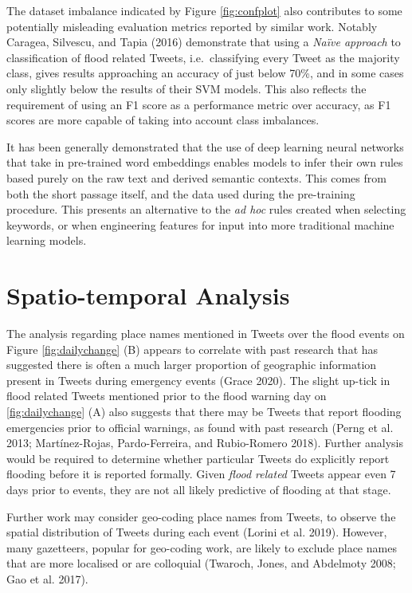 \documentclass[a4paper, notitlepage]{extreport}
\begin{document}
The dataset imbalance indicated by Figure \ref{fig:confplot} also
contributes to some potentially misleading evaluation metrics reported
by similar work. Notably Caragea, Silvescu, and Tapia (2016) demonstrate
that using a \emph{Naïve approach} to classification of flood related
Tweets, i.e.~classifying every Tweet as the majority class, gives
results approaching an accuracy of just below 70\%, and in some cases
only slightly below the results of their SVM models. This also reflects
the requirement of using an F1 score as a performance metric over
accuracy, as F1 scores are more capable of taking into account class
imbalances.

It has been generally demonstrated that the use of deep learning neural
networks that take in pre-trained word embeddings enables models to
infer their own rules based purely on the raw text and derived semantic
contexts. This comes from both the short passage itself, and the data
used during the pre-training procedure. This presents an alternative to
the \emph{ad hoc} rules created when selecting keywords, or when
engineering features for input into more traditional machine learning
models.

\hypertarget{spatio-temporal-analysis}{%
\section{Spatio-temporal Analysis}\label{spatio-temporal-analysis}}

The analysis regarding place names mentioned in Tweets over the flood
events on Figure \ref{fig:dailychange} (B) appears to correlate with
past research that has suggested there is often a much larger proportion
of geographic information present in Tweets during emergency events
(Grace 2020). The slight up-tick in flood related Tweets mentioned prior
to the flood warning day on \ref{fig:dailychange} (A) also suggests that
there may be Tweets that report flooding emergencies prior to official
warnings, as found with past research (Perng et al. 2013;
Martínez-Rojas, Pardo-Ferreira, and Rubio-Romero 2018). Further analysis
would be required to determine whether particular Tweets do explicitly
report flooding before it is reported formally. Given \emph{flood
related} Tweets appear even 7 days prior to events, they are not all
likely predictive of flooding at that stage.

Further work may consider geo-coding place names from Tweets, to observe
the spatial distribution of Tweets during each event (Lorini et al.
2019). However, many gazetteers, popular for geo-coding work, are likely
to exclude place names that are more localised or are colloquial
(Twaroch, Jones, and Abdelmoty 2008; Gao et al. 2017).
\end{document}
